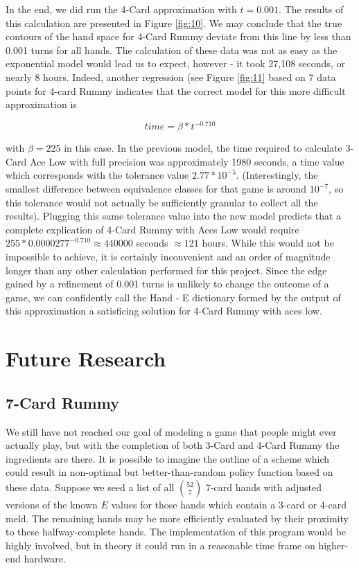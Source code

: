 \documentclass[letter,12pt]{article}
\begin{document}
In the end, we did run the 4-Card approximation with $t=0.001$. The results of this calculation are presented in Figure \ref{fig:10}. We may conclude that the true contours of the hand space for 4-Card Rummy deviate from this line by less than 0.001 turns for all hands. The calculation of these data was not as easy as the exponential model would lead us to expect, however - it took 27,108 seconds, or nearly 8 hours. Indeed, another regression (see Figure \ref{fig:11} based on 7 data points for 4-card Rummy indicates that the correct model for this more difficult approximation is

$$time = \beta * t^{-0.710}$$

with $\beta = 225$ in this case. In the previous model, the time required to calculate 3-Card Ace Low with full precision was approximately 1980 seconds, a time value which corresponds with the tolerance value $2.77*10^{-5}$. (Interestingly, the smallest difference between equivalence classes for that game is around $10^{-7}$, so this tolerance would not actually be sufficiently granular to collect all the results). Plugging this same tolerance value into the new model predicts that a complete explication of 4-Card Rummy with Aces Low would require $255 * 0.0000277^{-0.710} \approx 440000$ seconds $\approx 121$ hours. While this would not be impossible to achieve, it is certainly inconvenient and an order of magnitude longer than any other calculation performed for this project. Since the edge gained by a refinement of 0.001 turns is unlikely to change the outcome of a game, we can confidently call the Hand - E dictionary formed by the output of this approximation a satisficing solution for 4-Card Rummy with aces low. 

\section{Future Research}

\subsection{7-Card Rummy}

We still have not reached our goal of modeling a game that people might ever actually play, but with the completion of both 3-Card and 4-Card Rummy the ingredients are there. It is possible to imagine the outline of a scheme which could result in non-optimal but better-than-random policy function based on these data. Suppose we seed a list of all $\binom{52}{7}$ 7-card hands with adjusted versions of the known $E$ values for those hands which contain a 3-card or 4-card meld. The remaining hands may be more efficiently evaluated by their proximity to these halfway-complete hands. The implementation of this program would be highly involved, but in theory it could run in a reasonable time frame on higher-end hardware.
\end{document}
